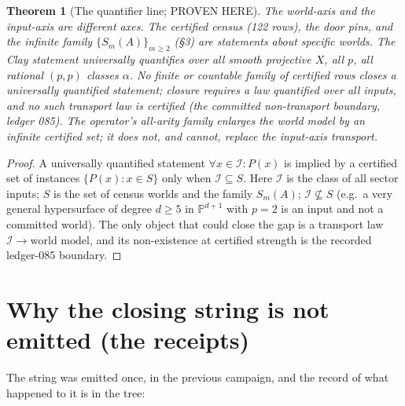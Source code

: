 \documentclass[11pt]{article}
\newtheorem{theorem}{Theorem}
\begin{document}
\begin{theorem}[The quantifier line; PROVEN HERE]
The world-axis and the input-axis are different axes. The certified
census (122 rows), the door pins, and the infinite family
$\{S_m(A)\}_{m\ge2}$ (\S3) are statements about specific worlds. The
Clay statement universally quantifies over all smooth projective
$X$, all $p$, all rational $(p,p)$ classes $\alpha$. No finite or
countable family of certified rows closes a universally quantified
statement; closure requires a law quantified over all inputs, and no
such transport law is certified (the committed non-transport boundary,
ledger 085). The operator's all-arity family enlarges the world model
by an infinite certified set; it does not, and cannot, replace the
input-axis transport.
\end{theorem}

\begin{proof}
A universally quantified statement $\forall x\in\mathcal I\colon
P(x)$ is implied by a certified set of instances $\{P(x)\colon x\in
S\}$ only when $\mathcal I\subseteq S$. Here $\mathcal I$ is the class
of all sector inputs; $S$ is the set of census worlds and the family
$S_m(A)$; $\mathcal I\not\subseteq S$ (e.g.\ a very general
hypersurface of degree $d\ge5$ in $\mathbb P^{d+1}$ with
$p=2$ is an input and not a committed world). The only object that
could close the gap is a transport law
$\mathcal I\to\text{world model}$, and its non-existence at
certified strength is the recorded ledger-085 boundary.
\end{proof}

\section{Why the closing string is not emitted (the receipts)}

The string was emitted once, in the previous campaign, and the record
of what happened to it is in the tree:
\end{document}
